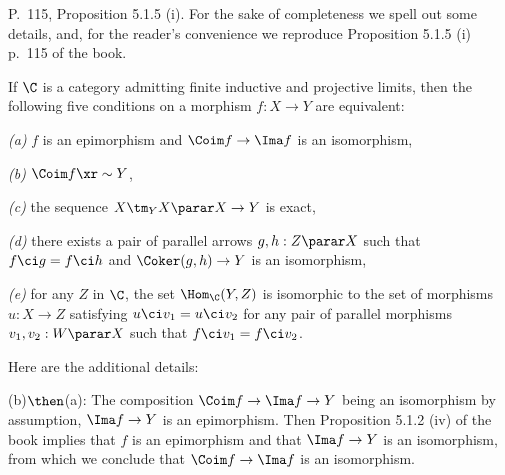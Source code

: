 \documentclass[12pt]{article}
\theoremstyle{remark}
\theoremstyle{definition}
\begin{document}
\begin{s}
P.~115, Proposition 5.1.5 (i). For the sake of completeness we spell out some details, and, for the reader's convenience we reproduce Proposition 5.1.5 (i) p.~115 of the book. 

\begin{prop}[Proposition 5.1.5 (i) p.~115] 
If $\C$ is a category admitting finite inductive and projective limits, then the following five conditions on a morphism $f:X\to Y$ are equivalent:

\nn\emph{(a)} $f$ is an epimorphism and $\Coim f\to\Ima f$ is an isomorphism,

\nn\emph{(b)} $\Coim f\xr\sim Y$,

\nn\emph{(c)} the sequence $X\tm_YX\parar X\to Y$ is exact,

\nn\emph{(d)} there exists a pair of parallel arrows $g,h:Z\parar X$ such that $f\ci g=f\ci h$ and $\Coker(g,h)\to Y$ is an isomorphism,

\nn\emph{(e)} for any $Z$ in $\C$, the set $\Hom_\C(Y,Z)$ is isomorphic to the set of morphisms $u:X\to Z$ satisfying $u\ci v_1=u\ci v_2$ for any pair of parallel morphisms $v_1,v_2:W\parar X$ such that $f\ci v_1=f\ci v_2$. 
\end{prop} 

Here are the additional details: 

\nn(b)$\then$(a): The composition $\Coim f\to\Ima f\to Y$ being an isomorphism by assumption, $\Ima f\to Y$ is an epimorphism. Then Proposition 5.1.2 (iv) of the book implies that $f$ is an epimorphism and that $\Ima f\to Y$ is an isomorphism, from which we conclude that $\Coim f\to\Ima f$ is an isomorphism.


\end{s}
\end{document}
